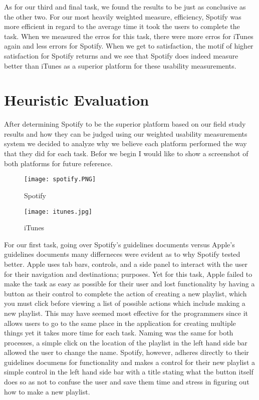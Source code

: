 \documentclass[a4paper]{article}
\begin{document}
As for our third and final task, we found the results to be just as conclusive as the other two. For our most heavily weighted measure, efficiency, Spotify was more efficient in regard to the average time it took the users to complete the task. When we measured the erros for this task, there were more erros for iTunes again and less errors for Spotify. When we get to satisfaction, the motif of higher satisfaction for Spotify returns and we see that Spotify does indeed measure better than iTunes as a superior platform for these usability measurements.



\section{Heuristic Evaluation}

After determining Spotify to be the superior platform based on our field study results and how they can be judged using our weighted usability measurements system we decided to analyze why we believe each platform performed the way that they did for each task. Befor we begin I would like to show a screenshot of both platforms for future reference.

\begin{figure}[H]
\centering
\texttt{[image: spotify.PNG]}
\caption{\label{task:spotify}Spotify}
\end{figure}
\begin{figure}[H]
\centering
\texttt{[image: itunes.jpg]}
\caption{\label{task:iTunes}iTunes}
\end{figure}

For our first task, going over Spotify's guidelines documents versus Apple's guidelines documents many differneces were evident as to why Spotify tested better. Apple uses tab bars, controls, and a side panel to interact with the user for their navigation and destinationa; purposes. Yet for this task, Apple failed to make the task as easy as possible for their user and lost functionality by having a button as their control to complete the action of creating a new playlist, which you must click before viewing a list of possible actions which include making a new playlist. This may have seemed most effective for the programmers since it allows users to go to the same place in the application for creating multiple things yet it takes more time for each task. Naming was the same for both processes, a simple click on the location of the playlist in the left hand side bar allowed the user to change the name. Spotify, however, adheres  directly to their guidelines documens for functionality and makes a control for their new playlist a simple control in the left hand side bar with a title stating what the button itself does so as not to confuse the user and save them time and stress in figuring out how to make a new playlist. 
\end{document}
